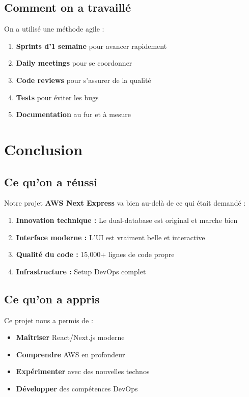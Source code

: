 \documentclass[12pt,a4paper]{report}
\begin{document}
\section{Comment on a travaillé}

On a utilisé une méthode agile :

\begin{enumerate}
    \item \textbf{Sprints d'1 semaine} pour avancer rapidement
    \item \textbf{Daily meetings} pour se coordonner
    \item \textbf{Code reviews} pour s'assurer de la qualité
    \item \textbf{Tests} pour éviter les bugs
    \item \textbf{Documentation} au fur et à mesure
\end{enumerate}

\chapter{Conclusion}

\section{Ce qu'on a réussi}

Notre projet \textbf{AWS Next Express} va bien au-delà de ce qui était demandé :

\begin{enumerate}
    \item \textbf{Innovation technique :} Le dual-database est original et marche bien
    \item \textbf{Interface moderne :} L'UI est vraiment belle et interactive
    \item \textbf{Qualité du code :} 15,000+ lignes de code propre
    \item \textbf{Infrastructure :} Setup DevOps complet
\end{enumerate}

\section{Ce qu'on a appris}

Ce projet nous a permis de :
\begin{itemize}
    \item \textbf{Maîtriser} React/Next.js moderne
    \item \textbf{Comprendre} AWS en profondeur
    \item \textbf{Expérimenter} avec des nouvelles technos
    \item \textbf{Développer} des compétences DevOps
\end{itemize}
\end{document}
